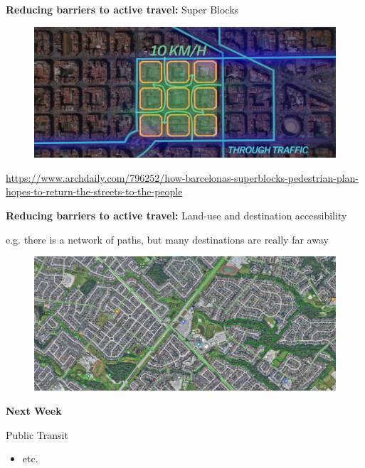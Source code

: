\documentclass[aspectratio=169]{beamer}
\begin{document}
\begin{frame}
	
	\textbf{Reducing barriers to active travel:} Super Blocks
	
	\begin{figure}
		\centering
		\includegraphics[width=0.8\linewidth]{images/super_blocks.png}
	\end{figure}
	
	\tiny 
	\url{https://www.archdaily.com/796252/how-barcelonas-superblocks-pedestrian-plan-hopes-to-return-the-streets-to-the-people}
	
	
	
\end{frame}



\begin{frame}
	
	\textbf{Reducing barriers to active travel:} Land-use and destination accessibility
	
	\vspace{2mm}
	
	e.g. there is a network of paths, but many destinations are really far away
	
	\begin{figure}
		\centering
		\includegraphics[width=1\linewidth]{images/suburb_bike_lanes.png}
	\end{figure}
	
%	
%	
%	
		
\end{frame}




\begin{frame}
	\textbf{Next Week} 
	
	\vspace{4mm}
	
	Public Transit
	
	\begin{itemize}
				
		
		\item etc.
				
		
	\end{itemize}
	
\end{frame}
\end{document}
